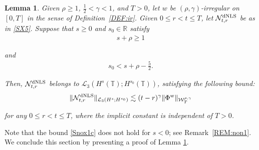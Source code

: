 \documentclass[letterpaper, 11pt,  reqno]{amsart}
\newtheorem{lemma}[theorem]{Lemma}
\newcommand{\1}{\hspace{0.5mm}\text{I}\hspace{0.5mm}}
\newcommand{\noi}{\noindent}
\newcommand{\R}{\mathbb{R}}
\newcommand{\T}{\mathbb{T}}
\renewcommand{\L}{\mathcal{L}}
\newcommand{\g}{\gamma}
\newcommand{\les}{\lesssim}
\newcommand{\NN}{\mathcal{N}}
\newcommand{\W}{\mathcal{W}}
\newcommand{\dNLS}{\text{\rm dNLS} }
\numberwithin{equation}{section}
\numberwithin{theorem}{section}
\begin{document}
\begin{lemma}\label{LEM:nonlin6}
Given $\rho \ge 1$,  $\frac12< \g < 1$, and $T> 0$, 
let  $w$ be $(\rho,\g)$-irregular on $[0, T]$ in the sense of Definition~\ref{DEF:ir}.
Given $0 \le r < t \le T$, let $\NN^\dNLS_{t, r}$
be as in \eqref{SX5}.
Suppose that $s\ge 0$ and $s_0 \in \R$ satisfy
\begin{align}
s + \rho \ge  1 %
\label{Snox1a}
\end{align}

\noi
and 
\begin{align}
s_0 < s + \rho - \frac 52.
\label{Snox1b}
\end{align}

\noi
Then, 
$\NN_{t, r}^\dNLS$  belongs to $\L_3(H^s(\T); H^{s_0}(\T))$, 
satisfying
 the following bound\textup{:}
\begin{align}
 \|\NN^\dNLS_{t, r}\|_{\L_3(H^s; H^{s_0})}
\les 
(t- r)^\g  \|\Phi^w\|_{  \W^{\rho,\g}_T}
\label{Snox1c}
\end{align}

\noi
for any $0 \le r < t \le T$, 
where the implicit constant is independent of $T > 0$.


\end{lemma}



Note that 
the bound \eqref{Snox1c}
does not hold for $s < 0$; see
Remark~\ref{REM:non1}.
We conclude this section by  presenting a proof of  Lemma \ref{LEM:nonlin6}.
\end{document}
